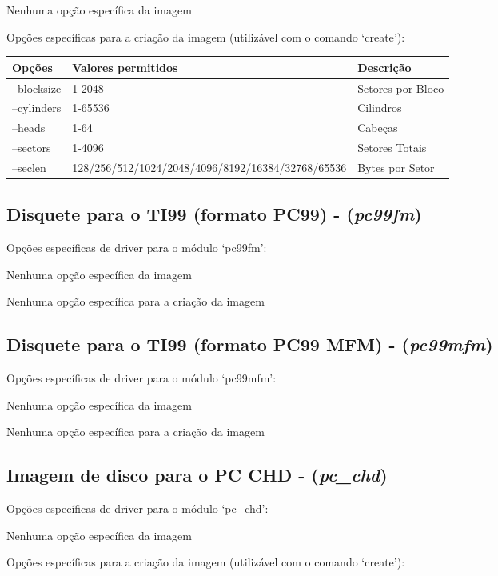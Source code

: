 \documentclass[letterpaper,10pt,brazil]{sphinxmanual}
\begin{document}
Nenhuma opção específica da imagem

Opções específicas para a criação da imagem (utilizável com o comando `create'):

\noindent\begin{tabulary}{\linewidth}{|L|L|L|}
\hline

Opções
&
Valores permitidos
&
Descrição
\\
\hline
--blocksize
&
1-2048
&
Setores por Bloco
\\
\hline
--cylinders
&
1-65536
&
Cilindros
\\
\hline
--heads
&
1-64
&
Cabeças
\\
\hline
--sectors
&
1-4096
&
Setores Totais
\\
\hline
--seclen
&
128/256/512/1024/2048/4096/8192/16384/32768/65536
&
Bytes por Setor
\\
\hline\end{tabulary}



\subsection{Disquete para o TI99 (formato PC99) - (\emph{pc99fm})}
\label{tools/imgtool:disquete-para-o-ti99-formato-pc99-pc99fm}
Opções específicas de driver para o módulo `pc99fm':

Nenhuma opção específica da imagem

Nenhuma opção específica para a criação da imagem


\subsection{Disquete para o TI99 (formato PC99 MFM) - (\emph{pc99mfm})}
\label{tools/imgtool:disquete-para-o-ti99-formato-pc99-mfm-pc99mfm}
Opções específicas de driver para o módulo `pc99mfm':

Nenhuma opção específica da imagem

Nenhuma opção específica para a criação da imagem


\subsection{Imagem de disco para o PC CHD - (\emph{pc\_chd})}
\label{tools/imgtool:imagem-de-disco-para-o-pc-chd-pc-chd}
Opções específicas de driver para o módulo `pc\_chd':

Nenhuma opção específica da imagem

Opções específicas para a criação da imagem (utilizável com o comando `create'):
\end{document}
